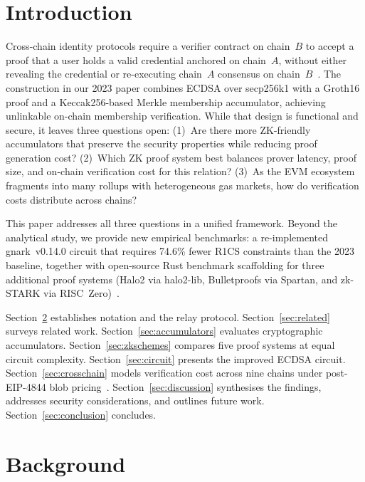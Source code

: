 \documentclass[conference]{IEEEtran}
\begin{document}
\section{Introduction}
\label{sec:intro}

Cross-chain identity protocols require a verifier contract on chain~$B$
to accept a proof that a user holds a valid credential anchored on
chain~$A$, without either revealing the credential or re-executing
chain~$A$ consensus on chain~$B$~\cite{Kravchenko2023}.
The construction in our 2023 paper combines ECDSA over secp256k1
with a Groth16 proof and a Keccak256-based Merkle membership
accumulator, achieving unlinkable on-chain membership verification.
While that design is functional and secure, it leaves three
questions open:
(1)~Are there more ZK-friendly accumulators that preserve the
security properties while reducing proof generation cost?
(2)~Which ZK proof system best balances prover latency, proof size,
and on-chain verification cost for this relation?
(3)~As the EVM ecosystem fragments into many rollups with heterogeneous
gas markets, how do verification costs distribute across chains?

This paper addresses all three questions in a unified framework.
Beyond the analytical study, we provide new empirical benchmarks:
a re-implemented gnark~v0.14.0 circuit that requires 74.6\% fewer
R1CS constraints than the 2023 baseline, together with open-source
Rust benchmark scaffolding for three additional proof systems
(Halo2 via halo2-lib, Bulletproofs via Spartan, and zk-STARK via
RISC~Zero)~\cite{ArtifactRepo}.

Section~\ref{sec:background} establishes notation and the relay protocol.
Section~\ref{sec:related} surveys related work.
Section~\ref{sec:accumulators} evaluates cryptographic accumulators.
Section~\ref{sec:zkschemes} compares five proof systems at equal circuit
complexity.
Section~\ref{sec:circuit} presents the improved ECDSA circuit.
Section~\ref{sec:crosschain} models verification cost across nine chains
under post-EIP-4844 blob pricing~\cite{EIP4844}.
Section~\ref{sec:discussion} synthesises the findings, addresses security
considerations, and outlines future work.
Section~\ref{sec:conclusion} concludes.

\section{Background}
\label{sec:background}
\end{document}
